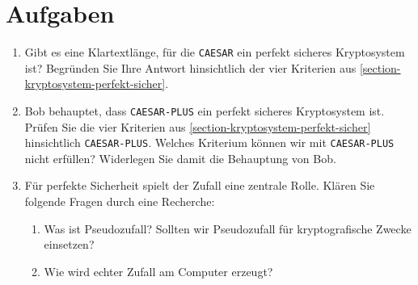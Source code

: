 \section{Aufgaben}

\begin{enumerate}
	\item Gibt es eine Klartextlänge, für die \texttt{CAESAR} ein perfekt sicheres Kryptosystem ist? Begründen Sie Ihre Antwort hinsichtlich der vier Kriterien aus \autoref{section-kryptosystem-perfekt-sicher}.
	
	\fillwithgrid{2in}
	
	\item Bob behauptet, dass \texttt{CAESAR-PLUS} ein perfekt sicheres Kryptosystem ist. Prüfen Sie die vier Kriterien aus  \autoref{section-kryptosystem-perfekt-sicher} hinsichtlich \texttt{CAESAR-PLUS}. Welches Kriterium können wir mit \texttt{CAESAR-PLUS} nicht erfüllen? Widerlegen Sie damit die Behauptung von Bob.

	\fillwithgrid{2in}

	\item Für perfekte Sicherheit spielt der Zufall eine zentrale Rolle. Klären Sie folgende Fragen durch eine Recherche:
		\begin{enumerate}
		\item Was ist Pseudozufall? Sollten wir Pseudozufall für kryptografische Zwecke einsetzen?	
		\item Wie wird echter Zufall am Computer erzeugt?
		\end{enumerate}

\end{enumerate}